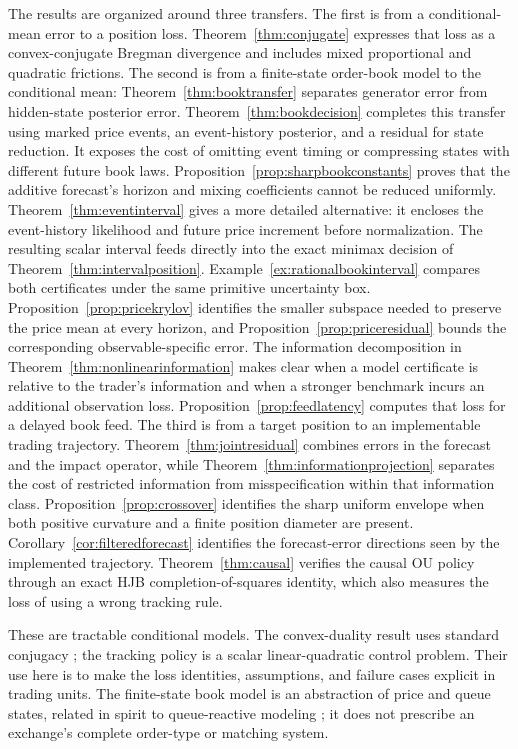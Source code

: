 \documentclass[11pt]{article}
\theoremstyle{plain}
\theoremstyle{definition}
\theoremstyle{remark}
\begin{document}
The results are organized around three transfers. The first is from a
conditional-mean error to a position loss. Theorem~\ref{thm:conjugate}
expresses that loss as a convex-conjugate Bregman divergence and includes
mixed proportional and quadratic frictions. The second is from a
finite-state order-book model to the conditional mean:
Theorem~\ref{thm:booktransfer} separates generator error from
hidden-state posterior error. Theorem~\ref{thm:bookdecision} completes
this transfer using marked price events, an event-history posterior,
and a residual for state reduction. It exposes the cost of omitting
event timing or compressing states with different future book laws.
Proposition~\ref{prop:sharpbookconstants} proves that the additive
forecast's horizon and mixing coefficients cannot be reduced
uniformly. Theorem~\ref{thm:eventinterval} gives a more detailed
alternative: it encloses the event-history likelihood and future
price increment before normalization. The resulting scalar interval
feeds directly into the exact minimax decision of
Theorem~\ref{thm:intervalposition}. Example~\ref{ex:rationalbookinterval}
compares both certificates under the same primitive uncertainty box.
Proposition~\ref{prop:pricekrylov} identifies the smaller subspace
needed to preserve the price mean at every horizon, and
Proposition~\ref{prop:priceresidual} bounds the corresponding
observable-specific error. The information decomposition in
Theorem~\ref{thm:nonlinearinformation} makes clear when a model
certificate is relative to the trader's information and when a
stronger benchmark incurs an additional observation loss.
Proposition~\ref{prop:feedlatency} computes that loss for a
delayed book feed.
The third is from a target position to an
implementable trading trajectory. Theorem~\ref{thm:jointresidual}
combines errors in the forecast and the impact operator, while
Theorem~\ref{thm:informationprojection} separates the cost of restricted
information from misspecification within that information class.
Proposition~\ref{prop:crossover} identifies the sharp uniform envelope
when both positive curvature and a finite position diameter are present.
Corollary~\ref{cor:filteredforecast} identifies the forecast-error
directions seen by the implemented trajectory.
Theorem~\ref{thm:causal} verifies the
causal OU policy through an exact HJB completion-of-squares identity,
which also measures the loss of using a wrong tracking rule.

These are tractable conditional models. The convex-duality result uses
standard conjugacy \citep{Rockafellar1970}; the tracking policy is a
scalar linear-quadratic control problem. Their use here is to make the
loss identities, assumptions, and failure cases explicit in trading
units. The finite-state book model is an abstraction of price and queue
states, related in spirit to queue-reactive modeling
\citep{HuangLehalleRosenbaum2015}; it does not prescribe an exchange's
complete order-type or matching system.
\end{document}
